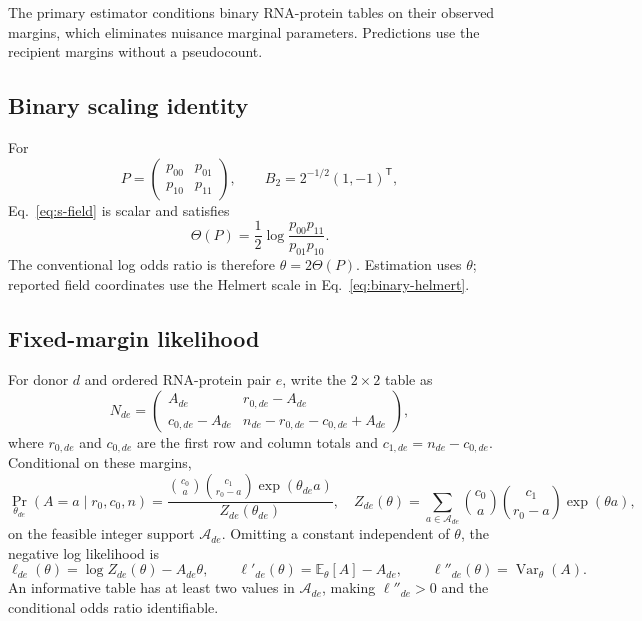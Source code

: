 \documentclass[10pt,a4paper]{article}
\newcommand{\field}{\Theta}
\newcommand{\E}{\mathbb{E}}
\begin{document}
The primary estimator conditions binary RNA-protein tables on their observed margins, which eliminates nuisance marginal parameters. Predictions use the recipient margins without a pseudocount.

\subsection{Binary scaling identity}

For
\[
P=\begin{pmatrix}p_{00}&p_{01}\\p_{10}&p_{11}\end{pmatrix},
\qquad
B_2=2^{-1/2}(1,-1)^{\mathsf T},
\]
Eq.~\eqref{eq:s-field} is scalar and satisfies
\begin{equation}
  \field(P)=\frac12\log\frac{p_{00}p_{11}}{p_{01}p_{10}}.
  \label{eq:binary-helmert}
\end{equation}
The conventional log odds ratio is therefore $\theta=2\field(P)$. Estimation uses $\theta$; reported field coordinates use the Helmert scale in Eq.~\eqref{eq:binary-helmert}.

\subsection{Fixed-margin likelihood}

For donor $d$ and ordered RNA-protein pair $e$, write the $2\times2$ table as
\[
N_{de}=\begin{pmatrix}
A_{de}&r_{0,de}-A_{de}\\
c_{0,de}-A_{de}&n_{de}-r_{0,de}-c_{0,de}+A_{de}
\end{pmatrix},
\]
where $r_{0,de}$ and $c_{0,de}$ are the first row and column totals and $c_{1,de}=n_{de}-c_{0,de}$. Conditional on these margins,
\begin{equation}
 \Pr_{\theta_{de}}(A=a\mid r_0,c_0,n)
 =\frac{\binom{c_0}{a}\binom{c_1}{r_0-a}\exp(\theta_{de}a)}
 {Z_{de}(\theta_{de})},
 \quad
 Z_{de}(\theta)=\sum_{a\in\mathcal A_{de}}
 \binom{c_0}{a}\binom{c_1}{r_0-a}\exp(\theta a),
 \label{eq:conditional-nchg}
\end{equation}
on the feasible integer support $\mathcal A_{de}$. Omitting a constant independent of $\theta$, the negative log likelihood is
\begin{equation}
 \ell_{de}(\theta)=\log Z_{de}(\theta)-A_{de}\theta,
 \qquad
 \ell'_{de}(\theta)=\E_\theta[A]-A_{de},
 \qquad
 \ell''_{de}(\theta)=\operatorname{Var}_\theta(A).
 \label{eq:conditional-derivatives}
\end{equation}
An informative table has at least two values in $\mathcal A_{de}$, making $\ell''_{de}>0$ and the conditional odds ratio identifiable.
\end{document}
